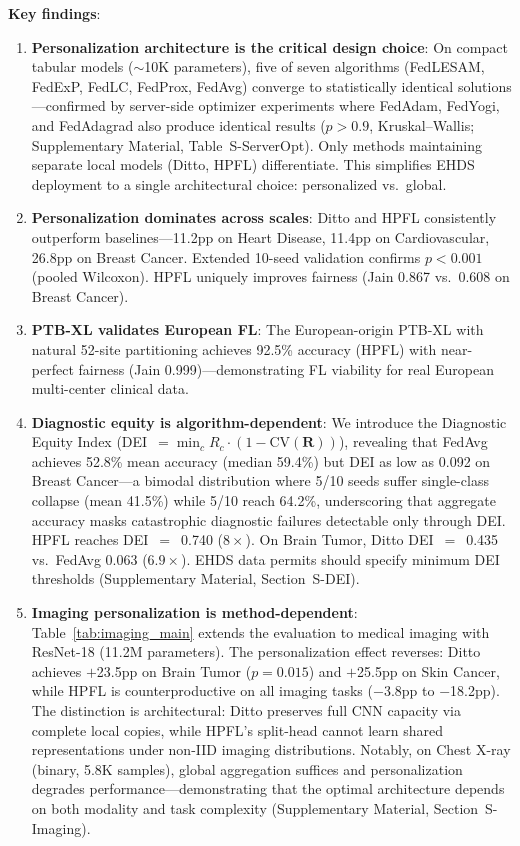 \documentclass[conference]{IEEEtran}
\begin{document}
\textbf{Key findings}:

\begin{enumerate}
    \item \textbf{Personalization architecture is the critical design choice}: On compact tabular models ($\sim$10K parameters), five of seven algorithms (FedLESAM, FedExP, FedLC, FedProx, FedAvg) converge to statistically identical solutions---confirmed by server-side optimizer experiments where FedAdam, FedYogi, and FedAdagrad also produce identical results ($p{>}0.9$, Kruskal--Wallis; Supplementary Material, Table~S-ServerOpt). Only methods maintaining separate local models (Ditto, HPFL) differentiate. This simplifies EHDS deployment to a single architectural choice: personalized vs.\ global.

    \item \textbf{Personalization dominates across scales}: Ditto and HPFL consistently outperform baselines---11.2pp on Heart Disease, 11.4pp on Cardiovascular, 26.8pp on Breast Cancer. Extended 10-seed validation confirms $p < 0.001$ (pooled Wilcoxon). HPFL uniquely improves fairness (Jain 0.867 vs.\ 0.608 on Breast Cancer).

    \item \textbf{PTB-XL validates European FL}: The European-origin PTB-XL with natural 52-site partitioning achieves 92.5\% accuracy (HPFL) with near-perfect fairness (Jain 0.999)---demonstrating FL viability for real European multi-center clinical data.

    \item \textbf{Diagnostic equity is algorithm-dependent}: We introduce the Diagnostic Equity Index (DEI~$= \min_c R_c \cdot (1 - \text{CV}(\mathbf{R}))$), revealing that FedAvg achieves 52.8\% mean accuracy (median 59.4\%) but DEI as low as 0.092 on Breast Cancer---a bimodal distribution where 5/10 seeds suffer single-class collapse (mean 41.5\%) while 5/10 reach 64.2\%, underscoring that aggregate accuracy masks catastrophic diagnostic failures detectable only through DEI. HPFL reaches DEI~$=$~0.740 ($8\times$). On Brain Tumor, Ditto DEI~$=$~0.435 vs.\ FedAvg 0.063 ($6.9\times$). EHDS data permits should specify minimum DEI thresholds (Supplementary Material, Section~S-DEI).

    \item \textbf{Imaging personalization is method-dependent}: Table~\ref{tab:imaging_main} extends the evaluation to medical imaging with ResNet-18 (11.2M parameters). The personalization effect reverses: Ditto achieves $+$23.5pp on Brain Tumor ($p{=}0.015$) and $+$25.5pp on Skin Cancer, while HPFL is counterproductive on all imaging tasks ($-$3.8pp to $-$18.2pp). The distinction is architectural: Ditto preserves full CNN capacity via complete local copies, while HPFL's split-head cannot learn shared representations under non-IID imaging distributions. Notably, on Chest X-ray (binary, 5.8K samples), global aggregation suffices and personalization degrades performance---demonstrating that the optimal architecture depends on both modality and task complexity (Supplementary Material, Section~S-Imaging).
\end{enumerate}
\end{document}
